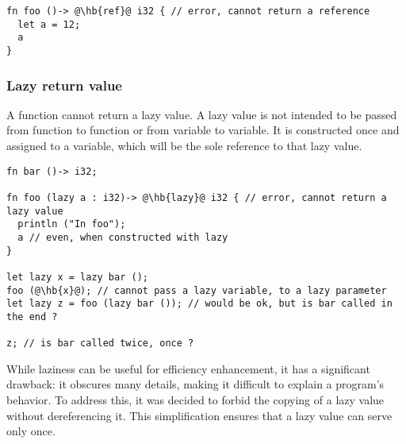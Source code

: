 \begin{lstlisting}[style=coloredverbatim, escapechar=@]
fn foo ()-> @\hb{ref}@ i32 { // error, cannot return a reference
  let a = 12;
  a
}
\end{lstlisting}

\subsubsection*{Lazy return value}
\label{sec:lazy_return}

A function cannot return a lazy value. A lazy value is not intended to be passed
from function to function or from variable to variable. It is constructed once
and assigned to a variable, which will be the sole reference to that lazy value.

\begin{lstlisting}[style=coloredverbatim, escapechar=@
]fn bar ()-> i32;

fn foo (lazy a : i32)-> @\hb{lazy}@ i32 { // error, cannot return a lazy value
  println ("In foo");
  a // even, when constructed with lazy
}

let lazy x = lazy bar ();
foo (@\hb{x}@); // cannot pass a lazy variable, to a lazy parameter
let lazy z = foo (lazy bar ()); // would be ok, but is bar called in the end ?

z; // is bar called twice, once ?
\end{lstlisting}

While laziness can be useful for efficiency enhancement, it has a significant
drawback: it obscures many details, making it difficult to explain a program's
behavior. To address this, it was decided to forbid the copying of a lazy value
without dereferencing it. This simplification ensures that a lazy value can
serve only once.

